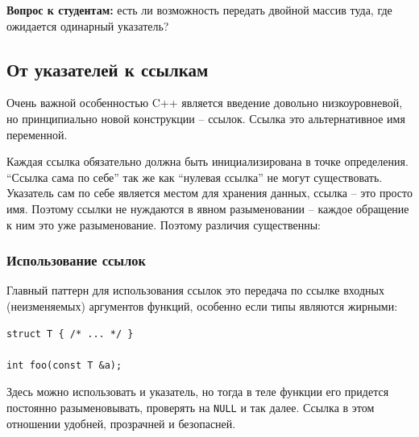 \documentclass[a4paper,12pt,oneside]{article}
\newif\ifanswers
\begin{document}
\textbf{Вопрос к студентам:} есть ли возможность передать двойной массив туда, где ожидается одинарный указатель?

\ifanswers
Ответ: да, есть забавный трюк.

\begin{lstlisting}
int func(int *a, int n, int m);
int a[2][3];
func (&a[0][0], 2, 3); /* ok */
\end{lstlisting}

Но внутри функции это потребует ручного обслуживания такого ``развернутого'' массива.
\fi

\pagebreak
\subsection{От указателей к ссылкам}\label{PointersAndRefs}

Очень важной особенностью C++ является введение довольно низкоуровневой, но принципиально новой конструкции – ссылок. Ссылка это альтернативное имя переменной.



Каждая ссылка обязательно должна быть инициализирована в точке определения. ``Ссылка сама по себе'' так же как ``нулевая ссылка'' не могут существовать. Указатель сам по себе является местом для хранения данных, ссылка – это просто имя. Поэтому ссылки не нуждаются в явном разыменовании – каждое обращение к ним это уже разыменование. Поэтому различия существенны:



\subsubsection{Использование ссылок}

Главный паттерн для использования ссылок это передача по ссылке входных (неизменяемых) аргументов функций, особенно если типы являются жирными:

\begin{lstlisting}
struct T { /* ... */ }

int foo(const T &a);
\end{lstlisting}

Здесь можно использовать и указатель, но тогда в теле функции его придется постоянно разыменовывать, проверять на \lstinline!NULL! и так далее. Ссылка в этом отношении удобней, прозрачней и безопасней.
\end{document}
